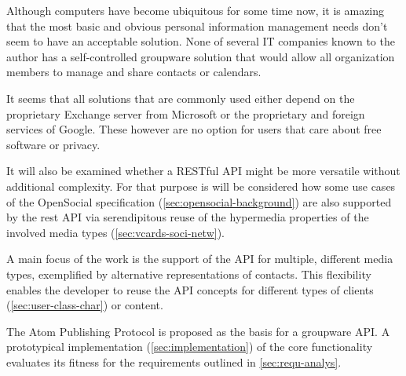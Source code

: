 \documentclass[11pt,a4paper,headsepline,twoside]{scrartcl}		%
\newcommand{\citeurl}[2]{\url{#1} (#2)}
\begin{document}
Although computers have become ubiquitous for some time now, it is amazing that the
most basic and obvious personal information management needs don't seem to have
an acceptable solution. None of several IT companies known to the author has a
self-controlled groupware solution that would allow all organization members to
manage and share contacts or calendars.

It seems that all solutions that are commonly used either depend on the
proprietary Exchange server from Microsoft or the proprietary and foreign
services of Google. These however are no option for users that care about free
software or privacy.




It will also be examined whether a RESTful API might be more versatile without
additional complexity. For that purpose is will be considered how some use
cases of the OpenSocial specification (\autoref{sec:opensocial-background}) are
also supported by the rest API via serendipitous reuse of the hypermedia
properties of the involved media types (\autoref{sec:vcards-soci-netw}).

A main focus of the work is the support of the API for multiple, different
media types, exemplified by alternative representations of contacts. This
flexibility enables the developer to reuse the API concepts for different types
of clients (\autoref{sec:user-class-char}) or content.

The Atom Publishing Protocol is proposed as the basis for a groupware API. A
prototypical implementation (\autoref{sec:implementation}) of the core
functionality evaluates its fitness for the requirements outlined in
\autoref{sec:requ-analys}.

\end{document}
